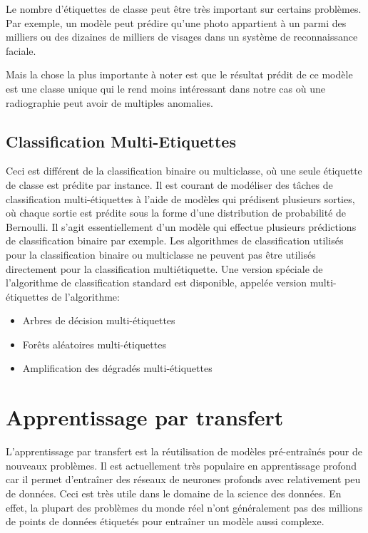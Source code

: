         Le nombre d'étiquettes de classe peut être très important sur certains problèmes. Par exemple, un modèle peut prédire qu'une photo appartient à un parmi des milliers ou des dizaines de milliers de visages dans un système de reconnaissance faciale.

        Mais la chose la plus importante à noter est que le résultat prédit de ce modèle est une classe unique qui le rend moins intéressant dans notre cas où une radiographie peut avoir de multiples anomalies.
    \subsection{Classification Multi-Etiquettes}
        Ceci est différent de la classification binaire ou multiclasse, où une seule étiquette de classe est prédite par instance. 
        Il est courant de modéliser des tâches de classification multi-étiquettes à l'aide de modèles qui prédisent plusieurs sorties, où chaque sortie est prédite sous la forme d'une distribution de probabilité de Bernoulli. Il s'agit essentiellement d'un modèle qui effectue plusieurs prédictions de classification binaire par exemple. 
        Les algorithmes de classification utilisés pour la classification binaire ou multiclasse ne peuvent pas être utilisés directement pour la classification multiétiquette. Une version spéciale de l'algorithme de classification standard est disponible, appelée version multi-étiquettes de l'algorithme:
        \begin{itemize}[label=$\bullet$]
            \item Arbres de décision multi-étiquettes
            \item Forêts aléatoires multi-étiquettes
            \item Amplification des dégradés multi-étiquettes
        \end{itemize}


\section{Apprentissage par transfert}
    L'apprentissage par transfert est la réutilisation de modèles pré-entraînés pour de nouveaux problèmes. Il est actuellement très populaire  en apprentissage profond car il permet d'entraîner des réseaux de neurones profonds avec relativement peu de données. Ceci est très utile dans le domaine de la science des données. En effet, la plupart des problèmes du monde réel n'ont généralement pas des millions de points de données étiquetés pour entraîner un modèle aussi complexe.


